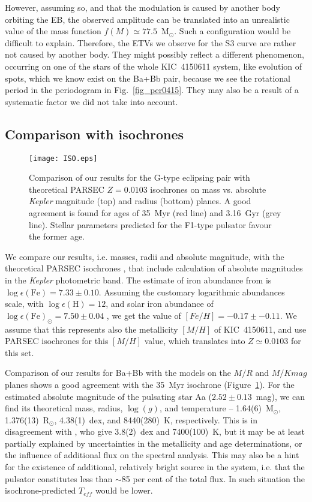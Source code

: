 \documentclass{aa}
\newcommand{\kep}{{\it Kepler }}
\begin{document}
However, assuming so, and that the modulation is caused by another body orbiting the EB, 
the observed amplitude can be translated into an unrealistic value of the mass function
$f(M) \simeq 77.5$~M$_\odot$. Such a configuration would be difficult to explain. 
Therefore, the ETVs we observe for the S3 curve are rather not caused by another body.
They might possibly reflect a different phenomenon, occurring on one of the
stars of the whole KIC~4150611 system, like evolution of spots, which we know exist on the
Ba+Bb pair, because we see the rotational period in the periodogram in Fig.~\ref{fig_per0415}.
They may also be a result of a systematic factor we did not take into account.

\subsection{Comparison with isochrones}

\begin{figure}
\centering
\texttt{[image: ISO.eps]}
\caption{Comparison of our results for the G-type eclipsing
pair with theoretical PARSEC $Z=0.0103$ isochrones on mass vs. 
absolute \kep magnitude (top) and radius (bottom) planes. A good
agreement is found for ages of 35~Myr (red line) and 3.16~Gyr 
(grey line). Stellar parameters predicted for the F1-type pulsator
favour the former age.}\label{fig_iso}
\end{figure}

We compare our results, i.e. masses, radii and absolute magnitude, with the 
theoretical PARSEC isochrones \citep{bre12}, that include calculation of 
absolute magnitudes in the \kep photometric band. The estimate of iron 
abundance from \citet{nie15} is $\log \epsilon(\mathrm{Fe})=7.33\pm0.10$.
Assuming the customary logarithmic abundances scale, with $\log \epsilon(\mathrm{H})=12$,
and solar iron abundance of $\log \epsilon(\mathrm{Fe})_\odot=7.50\pm0.04$
\citep{asp09}, we get the value of $[Fe/H]=-0.17\pm-0.11$. We assume that
this represents also the metallicity $[M/H]$ of KIC~4150611, and use PARSEC
isochrones for this $[M/H]$ value, which translates into $Z\simeq0.0103$
for this set.

Comparison of our results for Ba+Bb with the models on the $M/R$ and $M/Kmag$ 
planes shows a good agreement with the 35~Myr isochrone (Figure~\ref{fig_iso}). 
For the estimated absolute magnitude of the pulsating star Aa ($2.52\pm0.13$~mag), 
we can find its theoretical mass, radius, $\log(g)$, and temperature 
-- 1.64(6)~M$_\odot$, 1.376(13)~R$_\odot$, 4.38(1)~dex, and 8440(280)~K, 
respectively. This is in disagreement with \citet{nie15}, who give 3.8(2)~dex
and 7400(100)~K, but it may be at least partially explained by uncertainties 
in the metallicity and age determinations, or the influence of additional flux on 
the spectral analysis. This may also be a hint for the existence of additional, 
relatively bright source in the system, i.e. that the pulsator constitutes less 
than $\sim$85 per cent of the total flux. In such situation the isochrone-predicted 
$T_{eff}$ would be lower.
\end{document}
